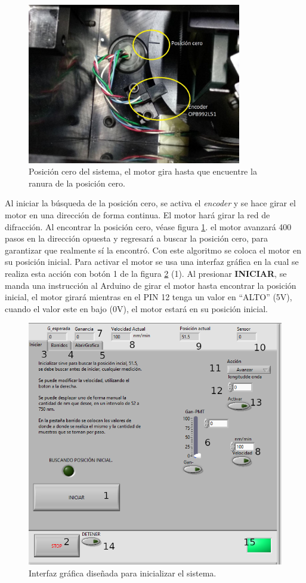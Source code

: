 \begin{figure}[h]
	\centering
	\includegraphics[width=0.7\linewidth,height= 7cm]{Imagenes/3/Encoder_01}
	\caption{Posición cero del sistema, el motor gira hasta que encuentre la ranura de la posición cero.}
	\label{fig:encoder01}
\end{figure}

Al iniciar la búsqueda de la posición cero,
se activa el \textit{encoder} y se hace girar el motor en una dirección de forma continua. El motor hará girar la red de difracción. Al encontrar la posición cero, véase figura \ref{fig:encoder01}. el motor avanzará 400 pasos en la dirección opuesta y regresará a buscar la posición cero, para garantizar que realmente sí la encontró.
Con este algoritmo se coloca el motor en su posición inicial. Para activar el motor se usa una interfaz gráfica en la cual se realiza esta acción con botón 1 de la figura \ref{fig:GUI_01} (1). Al presionar \textbf{INICIAR}, se manda una instrucción al Arduino de girar el motor hasta encontrar la posición inicial, el motor girará mientras en el PIN 12 tenga un valor en ``ALTO'' (5V), cuando el valor este en bajo (0V), el motor estará en su posición inicial.

\begin{figure}[h]
	\centering
	\includegraphics[width=0.8\linewidth]{Imagenes/3/GUI_01}
	\caption{Interfaz gráfica diseñada para inicializar el sistema.}
	\label{fig:GUI_01}
\end{figure}

